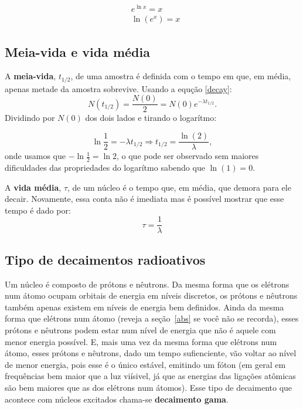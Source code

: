 \documentclass{article}
\begin{document}
\begin{equation}
\begin{split}
&e^{\ln x} = x\\
&\ln (e^x) = x
\end{split}
\end{equation}

\subsection{Meia-vida e vida m\'edia}

A \textbf{meia-vida}, $t_{1/2}$, de uma amostra \'e definida com o tempo em que, em m\'edia, apenas metade da amostra sobrevive. Usando a equ\c c\~ao \eqref{decay}:
\begin{equation}
N(t_{1/2}) = \frac{N(0)}{2} = N(0) e^{-\lambda t_{1/2}}.
\end{equation}
Dividindo por $N(0)$ dos dois lados e tirando o logar\'itmo:

\begin{equation}
\ln\frac{1}{2} = -\lambda t_{1/2} \Rightarrow t_{1/2} = \frac{\ln(2)}{\lambda},
\end{equation}
onde usamos que $-\ln\frac{1}{2} = \ln 2$, o que pode ser observado sem maiores dificuldades das propriedades do logar\'itmo sabendo que $\ln(1) = 0$.

A \textbf{vida m\'edia}, $\tau$, de um n\'ucleo \'e o tempo que, em m\'edia, que demora para ele decair. Novamente, essa conta n\~ao \'e imediata mas \'e poss\'ivel mostrar que esse tempo \'e dado por:
\begin{equation}
\tau = \frac{1}{\lambda}
\end{equation}

\subsection{Tipo de decaimentos radioativos}

Um n\'ucleo \'e composto de pr\'otons e n\^eutrons. Da mesma forma que os el\'etrons num \'atomo ocupam orbitais de energia em n\'iveis discretos, os pr\'otons e n\^eutrons tamb\'em apenas existem em n\'iveis de energia bem definidos. Ainda da mesma forma que el\'etrons num \'atomo (reveja a se\c c\~ao~\ref{abs} se voc\^e n\~ao se recorda), esses pr\'otons e n\^eutrons podem estar num n\'ivel de energia que n\~ao \'e aquele com menor energia poss\'ivel. E, mais uma vez da mesma forma que el\'etrons num \'atomo, esses pr\'otons e n\^eutrons, dado um tempo sufienciente, v\~ao voltar ao n\'ivel de menor energia, pois esse \'e o \'unico est\'avel, emitindo um f\'oton (em geral em frequ\^encias bem maior que a luz vi\'isivel, j\'a que as energias das liga\c c\~oes at\^omicas s\~ao bem maiores que as dos el\'etrons num \'atomos). Esse tipo de decaimento que acontece com n\'ucleos excitados chama-se \textbf{decaimento gama}.
\end{document}
